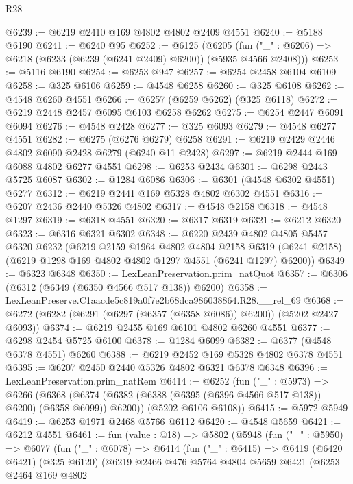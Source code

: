 \begin{lexlean}{R28}
\begin{coremodule}
@6239 := @6219 @2410 @169 @4802 @4802 @2409 @4551
@6240 := @5188 @6190
@6241 := @6240 @95
@6252 := @6125
    (@6205 (fun ("_" : @6206) => @6218 (@6233 (@6239 (@6241 @2409) @6200)) (@5935 @4566 @2408)))
@6253 := @5116 @6190
@6254 := @6253 @947
@6257 := @6254 @2458 @6104 @6109
@6258 := @325 @6106
@6259 := @4548 @6258
@6260 := @325 @6108
@6262 := @4548 @6260 @4551
@6266 := @6257 (@6259 @6262) (@325 @6118)
@6272 := @6219 @2448 @2457 @6095 @6103 @6258 @6262
@6275 := @6254 @2447 @6091 @6094
@6276 := @4548 @2428
@6277 := @325 @6093
@6279 := @4548 @6277 @4551
@6282 := @6275 (@6276 @6279) @6258
@6291 := @6219 @2429 @2446 @4802 @6090 @2428 @6279 (@6240 @11 @2428)
@6297 := @6219 @2444 @169 @6088 @4802 @6277 @4551
@6298 := @6253 @2434
@6301 := @6298 @2443 @5725 @6087
@6302 := @1284 @6086
@6306 := @6301 (@4548 @6302 @4551) @6277
@6312 := @6219 @2441 @169 @5328 @4802 @6302 @4551
@6316 := @6207 @2436 @2440 @5326 @4802
@6317 := @4548 @2158
@6318 := @4548 @1297
@6319 := @6318 @4551
@6320 := @6317 @6319
@6321 := @6212 @6320
@6323 := @6316 @6321 @6302
@6348 := @6220
    @2439
    @4802
    @4805
    @5457
    @6320
    @6232
    (@6219
      @2159
      @1964
      @4802
      @4804
      @2158
      @6319
      (@6241 @2158)
      (@6219 @1298 @169 @4802 @4802 @1297 @4551 (@6241 @1297) @6200))
@6349 := @6323 @6348
@6350 := LexLeanPreservation.prim_natQuot
@6357 := @6306 (@6312 (@6349 (@6350 @4566 @517 @138)) @6200)
@6358 := LexLeanPreserve.C1aacde5c819a0f7e2b68dca986038864.R28.__rel_69
@6368 := @6272 (@6282 (@6291 (@6297 (@6357 (@6358 @6086)) @6200)) (@5202 @2427 @6093))
@6374 := @6219 @2455 @169 @6101 @4802 @6260 @4551
@6377 := @6298 @2454 @5725 @6100
@6378 := @1284 @6099
@6382 := @6377 (@4548 @6378 @4551) @6260
@6388 := @6219 @2452 @169 @5328 @4802 @6378 @4551
@6395 := @6207 @2450 @2440 @5326 @4802 @6321 @6378 @6348
@6396 := LexLeanPreservation.prim_natRem
@6414 := @6252
    (fun ("_" : @5973) =>
    @6266
      (@6368 (@6374 (@6382 (@6388 (@6395 (@6396 @4566 @517 @138)) @6200) (@6358 @6099)) @6200))
      (@5202 @6106 @6108))
@6415 := @5972 @5949
@6419 := @6253 @1971 @2468 @5766 @6112
@6420 := @4548 @5659
@6421 := @6212 @4551
@6461 := fun (value : @18) =>
  @5802
    (@5948
      (fun ("_" : @5950) =>
      @6077
        (fun ("_" : @6078) =>
        @6414
          (fun ("_" : @6415) =>
          @6419
            (@6420 @6421)
            (@325 @6120)
            (@6219
              @2466
              @476
              @5764
              @4804
              @5659
              @6421
              (@6253
                @2464
                @169
                @4802

\end{coremodule}
\end{lexlean}
